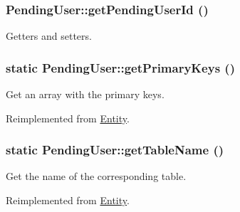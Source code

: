 \hypertarget{classPendingUser_a64da5190bd0b37f2b3905eb85c6c09fe}{
\subsubsection[{getPendingUserId}]{\setlength{\rightskip}{0pt plus 5cm}PendingUser::getPendingUserId ()}}
\label{classPendingUser_a64da5190bd0b37f2b3905eb85c6c09fe}
Getters and setters. \hypertarget{classPendingUser_a305b86bf62019e4ca80b769ea75644cf}{
\subsubsection[{getPrimaryKeys}]{\setlength{\rightskip}{0pt plus 5cm}static PendingUser::getPrimaryKeys ()}}
\label{classPendingUser_a305b86bf62019e4ca80b769ea75644cf}
Get an array with the primary keys. 

Reimplemented from \hyperlink{classEntity_a61bbfbb4058427174e002a09ddc77c41}{Entity}.

\hypertarget{classPendingUser_a8daaf97b6d90a79598d1354c872ac65c}{
\subsubsection[{getTableName}]{\setlength{\rightskip}{0pt plus 5cm}static PendingUser::getTableName ()}}
\label{classPendingUser_a8daaf97b6d90a79598d1354c872ac65c}
Get the name of the corresponding table. 

Reimplemented from \hyperlink{classEntity_a8305fd94740ac62cbafb9de76567ce37}{Entity}.



